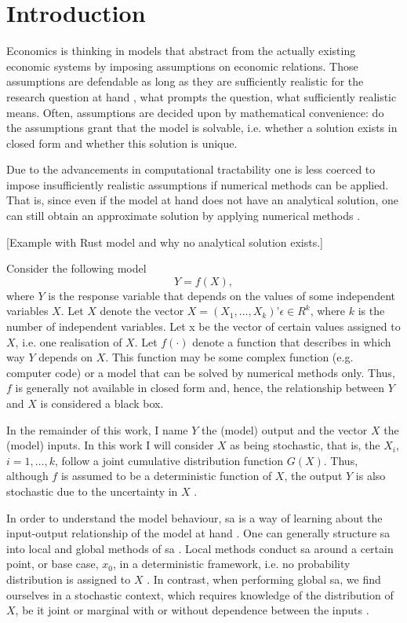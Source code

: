 \section{Introduction} \label{intro}

Economics is thinking in models that abstract from the actually existing economic systems by imposing assumptions on economic relations. Those assumptions are defendable as long as they are sufficiently realistic for the research question at hand \citep{F66}, what prompts the question, what sufficiently realistic means. Often, assumptions are decided upon by mathematical convenience: do the assumptions grant that the model is solvable, i.e. whether a solution exists in closed form and whether this solution is unique.

Due to the advancements in computational tractability one is less coerced to impose insufficiently realistic assumptions if numerical methods can be applied. That is, since even if the model at hand does not have an analytical solution, one can still obtain an approximate solution by applying numerical methods \citep{MF04}.

[Example with Rust model and why no analytical solution exists.]

Consider the following model
$$Y = f(X),$$
where $Y$ is the response variable that depends on the values of some independent variables $X$. Let $X$ denote the vector $X = (X_1, …, X_k)’ \epsilon \in R^k$, where $k$ is the number of independent variables. Let x be the vector of certain values assigned to $X$, i.e. one realisation of $X$. Let $f(\cdot)$ denote a function that describes in which way $Y$ depends on $X$. This function may be some complex function (e.g. computer code) or a model that can be solved by numerical methods only. Thus, $f$ is generally not available in closed form and, hence, the relationship between $Y$ and $X$ is considered a black box.

In the remainder of this work, I name $Y$ the (model) output and the vector $X$ the (model) inputs. In this work I will consider $X$ as being stochastic, that is, the $X_i$, $i = 1, …, k$, follow a joint cumulative distribution function $G(X)$. Thus, although $f$ is assumed to be a deterministic function of $X$, the output $Y$ is also stochastic due to the uncertainty in $X$ \citep{SNS16}.

In order to understand the model behaviour, sa is a way of learning about the input-output relationship of the model at hand \citep{BP16}. One can generally structure sa into local and global methods of sa \citep{BP16}. Local methods conduct sa around a certain point, or base case, $x_0$, in a deterministic framework, i.e. no probability distribution is assigned to $X$ \citep{BP16}. In contrast, when performing global sa, we find ourselves in a stochastic context, which requires knowledge of the distribution of $X$, be it joint or marginal with or without dependence between the inputs \citep{ST02}.

